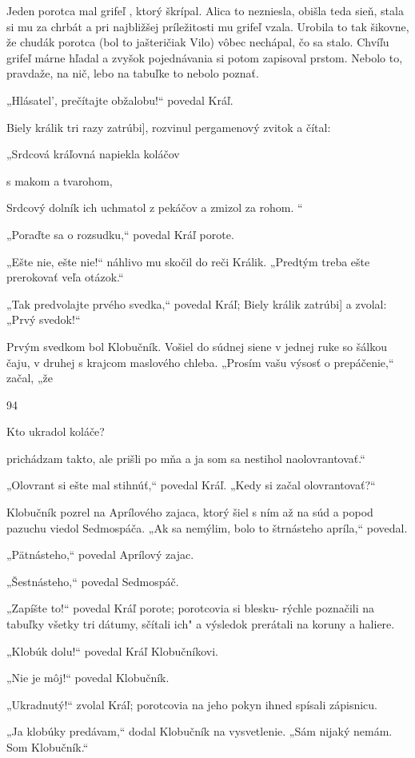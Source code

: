 \documentclass[12pt]{article}
\begin{document}
\begin{Parallel}[p]{}{}
{{Jeden porotca mal grifeľ , ktorý škrípal. Alica to nezniesla,
obišla teda sieň, stala si mu za chrbát a pri najbližšej
príležitosti mu grifeľ vzala. Urobila to tak šikovne, že
chudák porotca (bol to jašteričiak Vilo) vôbec nechápal, čo
sa stalo. Chvíľu grifeľ márne hľadal a zvyšok pojednávania
si potom zapisoval prstom. Nebolo to, pravdaže, na nič,
lebo na tabuľke to nebolo poznať.

„Hlásatel', prečítajte obžalobu!“ povedal Kráľ.

Biely králik tri razy zatrúbi], rozvinul pergamenový zvitok
a čítal:

„Srdcová kráľovná napiekla koláčov

s makom a tvarohom,

Srdcový dolník ich uchmatol z pekáčov
a zmizol za rohom. “

„Poraďte sa o rozsudku,“ povedal Kráľ porote.

„Ešte nie, ešte nie!“ náhlivo mu skočil do reči Králik.
„Predtým treba ešte prerokovať veľa otázok.“

„Tak predvolajte prvého svedka,“ povedal Kráľ; Biely
králik zatrúbi] a zvolal: „Prvý svedok!“

Prvým svedkom bol Klobučník. Vošiel do súdnej siene
v jednej ruke so šálkou čaju, v druhej s krajcom maslového
chleba. „Prosím vašu výsosť o prepáčenie,“ začal, „že

94

Kto ukradol koláče?

prichádzam takto, ale prišli po mňa a ja som sa nestihol
naolovrantovať.“

„Olovrant si ešte mal stihnúť,“ povedal Kráľ. „Kedy si
začal olovrantovať?“

Klobučník pozrel na Aprílového zajaca, ktorý šiel s ním až
na súd a popod pazuchu viedol Sedmospáča. „Ak sa
nemýlim, bolo to štrnásteho apríla,“ povedal.

„Pätnásteho,“ povedal Aprílový zajac.

„Šestnásteho,“ povedal Sedmospáč.

„Zapíšte to!“ povedal Kráľ porote; porotcovia si blesku-
rýchle poznačili na tabuľky všetky tri dátumy, sčítali ich"
a výsledok prerátali na koruny a haliere.

„Klobúk dolu!“ povedal Kráľ Klobučníkovi.

„Nie je môj!“ povedal Klobučník.

„Ukradnutý!“ zvolal Kráľ; porotcovia na jeho pokyn
ihned spísali zápisnicu.

„Ja klobúky predávam,“ dodal Klobučník na vysvetlenie.
„Sám nijaký nemám. Som Klobučník.“

}}
\end{Parallel}
\end{document}

